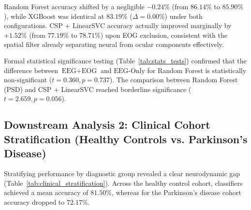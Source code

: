 \documentclass[11pt,a4paper]{article}
\renewcommand{\arraystretch}{1.15}
\begin{document}
Random Forest accuracy shifted by a negligible $-0.24\%$ (from $86.14\%$ to $85.90\%$), while XGBoost was identical at $83.19\%$ ($\Delta = 0.00\%$) under both configurations. CSP + LinearSVC accuracy actually improved marginally by $+1.52\%$ (from $77.19\%$ to $78.71\%$) upon EOG exclusion, consistent with the spatial filter already separating neural from ocular components effectively.

Formal statistical significance testing (Table~\ref{tab:stats_tests}) confirmed that the difference between $\text{EEG}+\text{EOG}$ and $\text{EEG-Only}$ for Random Forest is statistically non-significant ($t = 0.360, p = 0.737$). The comparison between Random Forest (PSD) and CSP + LinearSVC reached borderline significance ($t = 2.659, p = 0.056$).

\begin{table}[htbp]
\centering
\caption{Statistical Significance Hypothesis Testing Across Models and Configurations}
\label{tab:stats_tests}
\vspace{0.4em}
\renewcommand{\arraystretch}{1.25}
\end{table}

\subsection{Downstream Analysis 2: Clinical Cohort Stratification (Healthy Controls vs. Parkinson's Disease)}
Stratifying performance by diagnostic group revealed a clear neurodynamic gap (Table~\ref{tab:clinical_stratification}). Across the healthy control cohort, classifiers achieved a mean accuracy of $81.50\%$, whereas for the Parkinson's disease cohort accuracy dropped to $72.17\%$.
\end{document}
